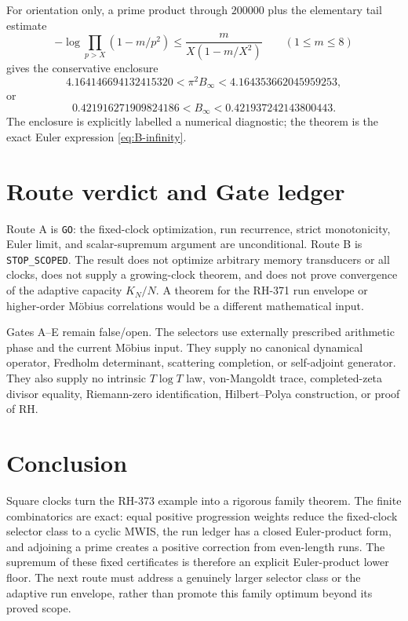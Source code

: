 \documentclass[11pt]{article}
\theoremstyle{definition}
\theoremstyle{remark}
\begin{document}
For orientation only, a prime product through $200000$ plus the elementary
tail estimate
\[
 -\log\prod_{p>X}(1-m/p^2)
 \le \frac{m}{X(1-m/X^2)}
 \qquad(1\le m\le8)
\]
gives the conservative enclosure
\[
 4.164146694132415320<\pi^2B_\infty<4.164353662045959253,
\]
or
\[
 0.421916271909824186<B_\infty<0.421937242143800443.
\]
The enclosure is explicitly labelled a numerical diagnostic; the theorem is
the exact Euler expression \eqref{eq:B-infinity}.

\section{Route verdict and Gate ledger}

Route A is \texttt{GO}: the fixed-clock optimization, run recurrence, strict
monotonicity, Euler limit, and scalar-supremum argument are unconditional.
Route B is \texttt{STOP\_SCOPED}.  The result does not optimize arbitrary
memory transducers or all clocks, does not supply a growing-clock theorem,
and does not prove convergence of the adaptive capacity $K_N/N$.  A theorem
for the RH-371 run envelope or higher-order M\"obius correlations would be a
different mathematical input.

Gates A--E remain false/open.  The selectors use externally prescribed
arithmetic phase and the current M\"obius input.  They supply no canonical
dynamical operator, Fredholm determinant, scattering completion, or
self-adjoint generator.  They also supply no intrinsic $T\log T$ law,
von-Mangoldt trace, completed-zeta divisor equality, Riemann-zero
identification, Hilbert--Polya construction, or proof of RH.

\section{Conclusion}

Square clocks turn the RH-373 example into a rigorous family theorem.  The
finite combinatorics are exact: equal positive progression weights reduce the
fixed-clock selector class to a cyclic MWIS, the run ledger has a closed
Euler-product form, and adjoining a prime creates a positive correction from
even-length runs.  The supremum of these fixed certificates is therefore an
explicit Euler-product lower floor.  The next route must address a genuinely
larger selector class or the adaptive run envelope, rather than promote this
family optimum beyond its proved scope.



\end{document}
